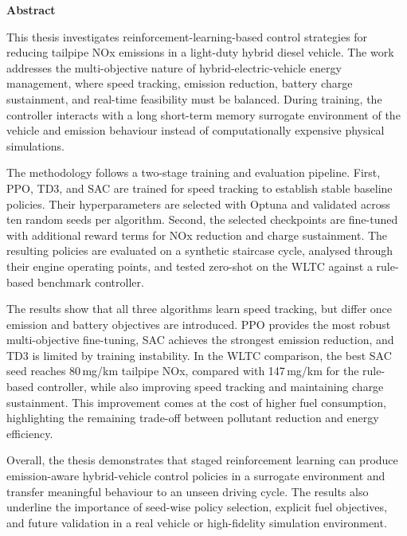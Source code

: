 \documentclass[parskip=half, fontsize=11pt]{report}
\newcommand{\frontmatterchapterheading}[1]{%
  \phantomsection
  \addcontentsline{toc}{chapter}{#1}
  \markboth{}{}
  \thispagestyle{empty}
  \vspace*{50pt}
  \begin{center}
    \normalfont\Huge\bfseries #1
  \end{center}
  \vspace{2em}
}
\begin{document}




\setcounter{page}{1}

\begingroup
\setlength{\parindent}{0pt}
\setlength{\parskip}{0.75em}

\frontmatterchapterheading{Abstract}

This thesis investigates reinforcement-learning-based control strategies for reducing tailpipe \ac{NOx} emissions in a light-duty hybrid diesel vehicle. The work addresses the multi-objective nature of hybrid-electric-vehicle energy management, where speed tracking, emission reduction, battery charge sustainment, and real-time feasibility must be balanced. During training, the controller interacts with a long short-term memory surrogate environment of the vehicle and emission behaviour instead of computationally expensive physical simulations.

The methodology follows a two-stage training and evaluation pipeline. First, \ac{PPO}, \ac{TD3}, and \ac{SAC} are trained for speed tracking to establish stable baseline policies. Their hyperparameters are selected with Optuna and validated across ten random seeds per algorithm. Second, the selected checkpoints are fine-tuned with additional reward terms for \ac{NOx} reduction and charge sustainment. The resulting policies are evaluated on a synthetic staircase cycle, analysed through their engine operating points, and tested zero-shot on the WLTC against a rule-based benchmark controller.

The results show that all three algorithms learn speed tracking, but differ once emission and battery objectives are introduced. \ac{PPO} provides the most robust multi-objective fine-tuning, \ac{SAC} achieves the strongest emission reduction, and \ac{TD3} is limited by training instability. In the WLTC comparison, the best \ac{SAC} seed reaches 80\,mg/km tailpipe \ac{NOx}, compared with 147\,mg/km for the rule-based controller, while also improving speed tracking and maintaining charge sustainment. This improvement comes at the cost of higher fuel consumption, highlighting the remaining trade-off between pollutant reduction and energy efficiency.

Overall, the thesis demonstrates that staged reinforcement learning can produce emission-aware hybrid-vehicle control policies in a surrogate environment and transfer meaningful behaviour to an unseen driving cycle. The results also underline the importance of seed-wise policy selection, explicit fuel objectives, and future validation in a real vehicle or high-fidelity simulation environment.
\end{document}
